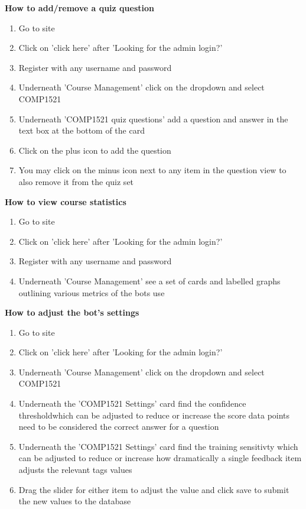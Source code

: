 \textbf{How to add/remove a quiz question}
\begin{enumerate}
	\item {Go to site}
	\item {Click on 'click here' after 'Looking for the admin login?'}
	\item {Register with any username and password}
	\item {Underneath 'Course Management' click on the dropdown and select COMP1521}
	\item {Underneath 'COMP1521 quiz questions' add a question and answer in the text box at the bottom of the card}
	\item {Click on the plus icon to add the question}
	\item {You may click on the minus icon next to any item in the question view to also remove it from the quiz set}
\end{enumerate}

\textbf{How to view course statistics}
\begin{enumerate}
	\item {Go to site}
	\item {Click on 'click here' after 'Looking for the admin login?'}
	\item {Register with any username and password}
	\item {Underneath 'Course Management' see a set of cards and labelled graphs outlining various metrics of the bots use}
\end{enumerate}

\textbf{How to adjust the bot's settings}
\begin{enumerate}
	\item {Go to site}
	\item {Click on 'click here' after 'Looking for the admin login?'}
	\item {Underneath 'Course Management' click on the dropdown and select COMP1521}
	\item {Underneath the 'COMP1521 Settings' card find the confidence thresholdwhich can be adjusted to reduce or increase the score data points need to be considered the correct answer for a question}
	\item {Underneath the 'COMP1521 Settings' card find the training sensitivty which can be adjusted to reduce or increase how dramatically a single feedback item adjusts the relevant tags values}
	\item {Drag the slider for either item to adjust the value and click save to submit the new values to the database}
\end{enumerate}

